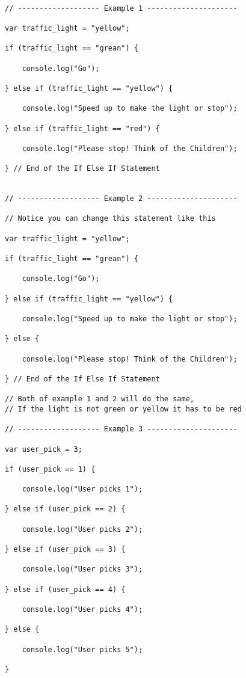 \documentclass[12pt, letterpaper]{article}
\begin{document}
\begin{lstlisting}

// ------------------- Example 1 ---------------------

var traffic_light = "yellow";

if (traffic_light == "grean") {

	console.log("Go");

} else if (traffic_light == "yellow") {

	console.log("Speed up to make the light or stop");

} else if (traffic_light == "red") {

	console.log("Please stop! Think of the Children");

} // End of the If Else If Statement


// ------------------- Example 2 ---------------------

// Notice you can change this statement like this

var traffic_light = "yellow";

if (traffic_light == "grean") {

	console.log("Go");

} else if (traffic_light == "yellow") {

	console.log("Speed up to make the light or stop");

} else {

	console.log("Please stop! Think of the Children");

} // End of the If Else If Statement

// Both of example 1 and 2 will do the same,
// If the light is not green or yellow it has to be red

// ------------------- Example 3 ---------------------

var user_pick = 3;

if (user_pick == 1) {

	console.log("User picks 1");

} else if (user_pick == 2) {

	console.log("User picks 2");

} else if (user_pick == 3) {

	console.log("User picks 3");

} else if (user_pick == 4) {

	console.log("User picks 4");

} else {

	console.log("User picks 5");	

}


\end{lstlisting}
\end{document}

